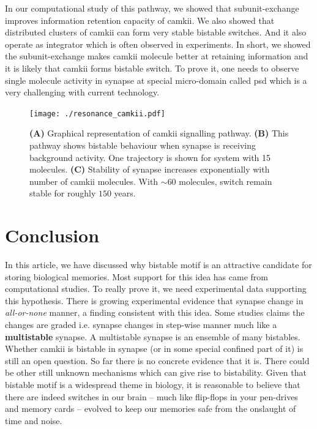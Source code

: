 \documentclass[]{resonance}
\begin{document}
In our computational study of this pathway, we showed that subunit-exchange
improves information retention capacity of \gls{camkii}. We also showed that
distributed clusters of \gls{camkii} can form very stable bistable switches. And
it also operate as integrator which is often observed in experiments. In short,
we showed the subunit-exchange makes \gls{camkii} molecule better at retaining
information and it is likely that \gls{camkii} forms bistable switch. To prove
it, one needs to observe single molecule activity in synapse at special
micro-domain called \gls{psd} which is a very challenging with current
technology.

\begin{figure}[h!]
    \caption{ \textbf{(A)} Graphical representation of \gls{camkii} signalling
        pathway. \textbf{(B)} This pathway shows bistable behaviour when synapse
        is receiving background activity. One trajectory is shown for system with 
        15 molecules. \textbf{(C)} Stability of synapse increases exponentially
        with number of \gls{camkii} molecules. With $\sim 60$ molecules, switch
        remain stable for roughly $150$ years.
    }\label{fig:camkii_summary}
    \centering
    \texttt{[image: ./resonance\_camkii.pdf]}
\end{figure}


\section{Conclusion}

In this article, we have discussed why bistable motif is an attractive candidate
for storing biological memories. Most support for this idea has came from
computational studies. To really prove it, we need experimental data supporting
this hypothesis. There is growing experimental evidence that synapse change in
\textit{all-or-none} manner, a finding consistent with this idea. Some studies
claims the changes are graded i.e. synapse changes in step-wise manner much like
a \textbf{multistable} synapse. A multistable synapse is an ensemble of many
bistables. Whether \gls{camkii} is bistable in synapse (or in some special
confined part of it) is still an open question. So far there is no concrete
evidence that it is. There could be other still unknown mechanisms which can
give rise to bistability. Given that bistable motif is a widespread theme in
biology, it is reasonable to believe that there are indeed switches in our brain
-- much like flip-flops in your pen-drives and memory cards -- evolved to keep
our memories safe from the onslaught of time and noise.
\end{document}
